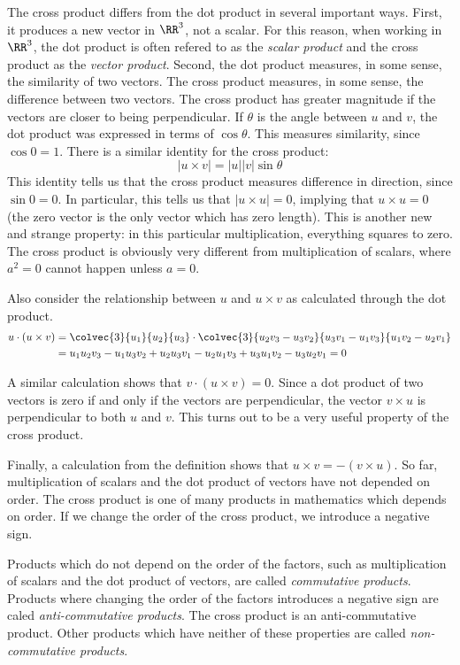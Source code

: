 \documentclass[fleqn]{report}
\begin{document}
The cross product differs from the dot product in several
important ways. First, it produces a new vector in $\RR^3$,
not a scalar. For this reason, when working in $\RR^3$, the
dot product is often refered to as the \emph{scalar product}
and the cross product as the \emph{vector product}. Second,
the dot product measures, in some sense, the similarity of two
vectors. The cross product measures, in some sense, the
difference between two vectors. The cross product has greater
magnitude if the vectors are closer to being perpendicular. If
$\theta$ is the angle between $u$ and $v$, the dot product was
expressed in terms of $\cos \theta$. This measures similarity,
since $\cos 0 = 1$. There is a similar identity for the cross
product:
\begin{equation*}
|u \times v| = |u||v| \sin \theta
\end{equation*}
This identity tells us that the cross product measures
difference in direction, since $\sin 0 = 0$. In particular,
this tells us that $|u \times u| = 0$, implying that $u \times
u = 0$ (the zero vector is the only vector which has zero
length). This is another new and strange property: in this
particular multiplication, everything squares to zero. The cross
product is obviously very different from multiplication of
scalars, where $a^2 = 0$ cannot happen unless $a=0$.

Also consider the relationship between $u$ and $u \times v$ as
calculated through the dot product.
\begin{align*}
u \cdot (u \times v) & = 
\colvec{3}{u_1}{u_2}{u_3} \cdot \colvec{3}{u_2v_3 -
u_3v_2}{u_3v_1 - u_1v_3}{u_1v_2 - u_2v_1} \\
& = u_1u_2v_3 - u_1u_3v_2 + u_2u_3v_1 - u_2u_1v_3 + u_3u_1v_2
- u_3u_2v_1 = 0
\end{align*}

A similar calculation shows that $v \cdot (u \times v) = 0$.
Since a dot product of two vectors is zero if and only if the
vectors are perpendicular, the vector $v \times u$ is
perpendicular to both $u$ and $v$. This turns out to be a
very useful property of the cross product.

Finally, a calculation from the definition shows that $u
\times v = -(v \times u)$. So far, multiplication of scalars and
the dot product of vectors have not depended on order. The
cross product is one of many products in mathematics which 
depends on order. If we change the order of the cross product,
we introduce a negative sign. 

\begin{defn}
Products which do not depend on the order of
the factors, such as multiplication of scalars and the dot product
of vectors, are called \emph{commutative products}. Products
where changing the order of the factors introduces a negative
sign are caled \emph{anti-commutative products}. The cross
product is an anti-commutative product. Other products which
have neither of these properties are called
\emph{non-commutative products}. 
\end{defn}
\end{document}
